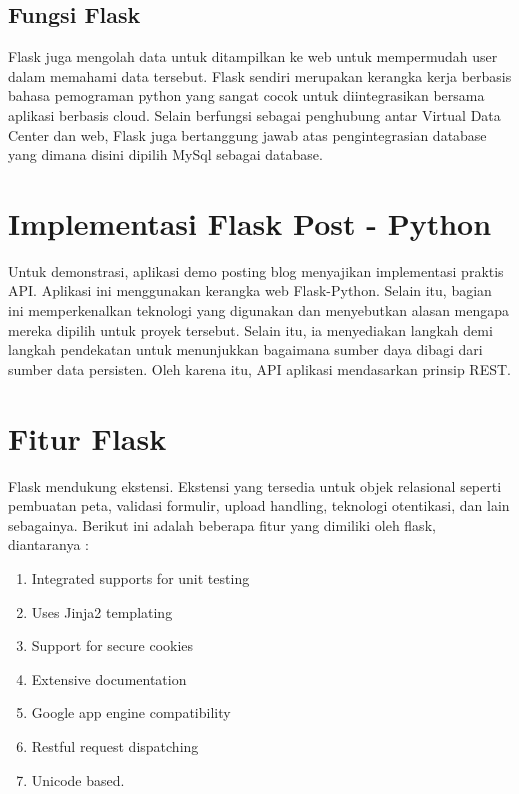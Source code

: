 \subsection{Fungsi Flask}
Flask juga mengolah data untuk ditampilkan ke web untuk mempermudah user dalam memahami data tersebut. Flask sendiri merupakan kerangka kerja berbasis bahasa pemograman python yang sangat cocok untuk diintegrasikan bersama aplikasi berbasis cloud. Selain berfungsi sebagai penghubung antar Virtual Data Center dan web, Flask juga bertanggung jawab atas pengintegrasian database yang dimana disini dipilih MySql sebagai database\cite{alauddin2017implementasi}.

\section{Implementasi Flask Post - Python}
Untuk demonstrasi, aplikasi demo posting blog menyajikan implementasi praktis API. Aplikasi ini menggunakan kerangka web Flask-Python. Selain itu, bagian ini memperkenalkan teknologi yang digunakan dan menyebutkan alasan mengapa mereka dipilih untuk proyek tersebut. Selain itu, ia menyediakan langkah demi langkah pendekatan untuk menunjukkan bagaimana sumber daya dibagi dari sumber data persisten. Oleh karena itu, API aplikasi mendasarkan prinsip REST\citep{alemu2014rest}.

\section{Fitur Flask}
Flask mendukung ekstensi. Ekstensi yang tersedia untuk objek relasional seperti pembuatan peta,
validasi formulir, upload handling, teknologi otentikasi, dan lain sebagainya. Berikut ini adalah beberapa
fitur yang dimiliki oleh flask, diantaranya :
\begin{enumerate}
  \item Integrated supports for unit testing
  \item Uses Jinja2 templating
  \item Support for secure cookies
  \item Extensive documentation
  \item Google app engine compatibility
  \item Restful request dispatching
  \item Unicode based\cite{lokhande2015efficient}.
\end{enumerate}